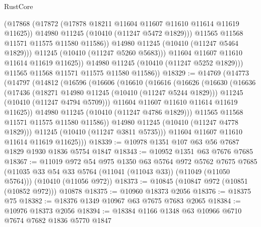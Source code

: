 \begin{lexlean}{RustCore}
\begin{coremodule}
                      (@17868
                        (@17872 (@17878 @18211 @11604 @11607 @11610 @11614 @11619 @11625))
                        @14980
                        @11245
                        (@10410 (@11247 @5472 @1829)))
                      @11565
                      @11568
                      @11571
                      @11575
                      @11580
                      @11586))
                  @14980
                  @11245
                  (@10410 (@11247 @5464 @1829)))
                @11245
                (@10410 (@11247 @5260 @5683)))
              @11604
              @11607
              @11610
              @11614
              @11619
              @11625))
          @14980
          @11245
          (@10410 (@11247 @5252 @1829)))
        @11565
        @11568
        @11571
        @11575
        @11580
        @11586))
@18329 := @14769
    (@14773
      (@14797
        (@14812
          (@16596
            (@16606
              (@16610
                (@16616
                  (@16626
                    (@16630
                      (@16636
                        (@17436
                          (@18271 @14980 @11245 (@10410 (@11247 @5244 @1829)))
                          @11245
                          (@10410 (@11247 @4794 @5709)))
                        @11604
                        @11607
                        @11610
                        @11614
                        @11619
                        @11625))
                    @14980
                    @11245
                    (@10410 (@11247 @4786 @1829)))
                  @11565
                  @11568
                  @11571
                  @11575
                  @11580
                  @11586))
              @14980
              @11245
              (@10410 (@11247 @4778 @1829)))
            @11245
            (@10410 (@11247 @3811 @5735)))
          @11604
          @11607
          @11610
          @11614
          @11619
          @11625)))
@18339 := @10978 @1351 @107 @63 @56 @7687 @1829 @1930 @1836 @5754 @1847
@18343 := @10952 @1351 @63 @7676 @7685
@18367 := @11019
    @972
    @54
    @975
    @1350
    @63
    @5764
    @972
    @5762
    @7675
    @7685
    (@11035 @33 @54 @33 @5764 (@11041 (@11043 @33)) (@11049 (@11050 @5764)))
    (@10410 (@11056 @972))
@18373 := @10845 (@10847 @972 (@10851 (@10852 @972))) @10878
@18375 := @10960 @18373 @2056
@18376 := @18375 @75
@18382 := @18376 @1349 @10967 @63 @7675 @7683 @2065
@18384 := @10976 @18373 @2056
@18394 := @18384 @1166 @1348 @63 @10966 @6710 @7674 @7682 @1836 @5770 @1847

\end{coremodule}
\end{lexlean}
